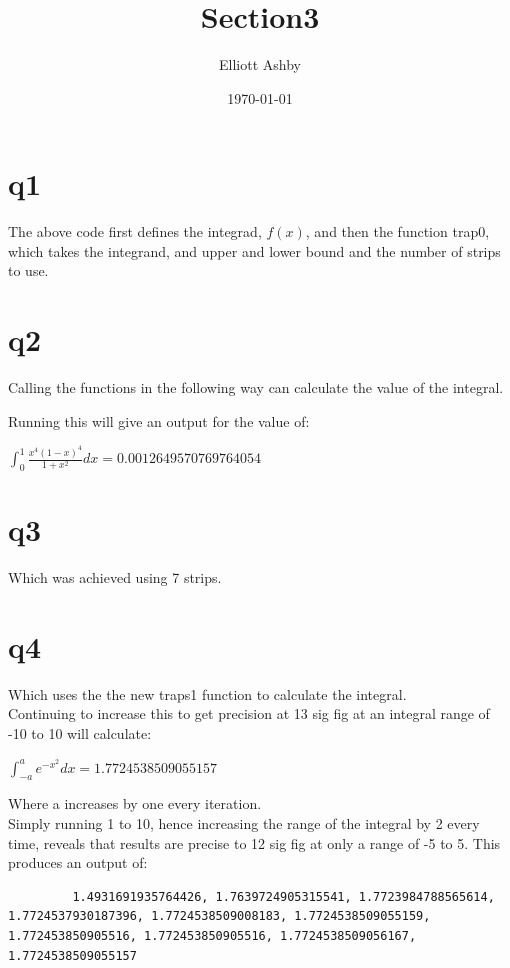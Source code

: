 \documentclass[a4paper,english]{article}
\title{Section3}
\author{Elliott Ashby}
\date{\today}
\begin{document}
    \maketitle
    \section{q1}
    
    The above code first defines the integrad, $f(x)$, and then the function trap0, which takes the integrand, and upper and lower bound and the number of strips to use.
    \section{q2}
    Calling the functions in the following way can calculate the value of the integral.
    
    Running this will give an output for the value of:
    \begin{center}
        $\int_0^1{\frac{x^4(1-x)^4}{1+x^2}dx} = 0.0012649570769764054$
    \end{center}
    \section{q3}
    Which was achieved using 7 strips.
    \section{q4}
    
    
    Which uses the the new traps1 function to calculate the integral. \\
    Continuing to increase this to get precision at 13 sig fig at an integral range of -10 to 10 will calculate:
    \begin{center}
            $\int_{-a}^a{e^{-x^2}dx} = 1.7724538509055157$
    \end{center}
    Where a increases by one every iteration. \\
    Simply running 1 to 10, hence increasing the range of the integral by 2 every time, reveals that results are precise to 12 sig fig at only a range of -5 to 5.
    This produces an output of:
    \begin{lstlisting}
         1.4931691935764426, 1.7639724905315541, 1.7723984788565614, 1.7724537930187396, 1.7724538509008183, 1.7724538509055159, 1.772453850905516, 1.772453850905516, 1.7724538509056167, 1.7724538509055157
    \end{lstlisting}
\end{document}
